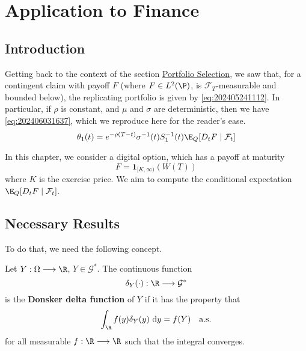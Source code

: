 \chapter{Application to Finance}

\section{Introduction}

Getting back to the context of the section \hyperref[portfolio-selection]{Portfolio Selection}, we saw that, for a contingent claim with payoff $F$ (where $F \in L^2(\P)$, is $\mathcal{F}_T$-measurable and bounded below), the replicating portfolio is given by \eqref{eq:202405241112}. In particular, if $\rho$ is constant, and $\mu$ and $\sigma$ are deterministic, then we have \eqref{eq:202406031637}, which we reproduce here for the reader's ease.
\[
\theta_1 (t) = e^{-\rho(T-t)} \sigma^{-1}(t) S_1^{-1}(t) \E_Q [D_t F \mid \mathcal{F}_t]
\]

In this chapter, we consider a digital option, which has a payoff at maturity
\[
F = \mathbf{1}_{[K, \infty)}(W(T))
\]
where $K$ is the exercise price. We aim to compute the conditional expectation $\E_Q [D_t F \mid \mathcal{F}_t]$. 

\section{Necessary Results}

To do that, we need the following concept.

\begin{definition}
Let $Y : \Omega \longrightarrow \R$, $Y \in \mathcal{G}^\ast$. The continuous function
\[
\delta_Y (\cdot) : \R \longrightarrow {\mathcal{G}^{\ast}}
\]
is the \textbf{Donsker delta function} of $Y$ if it has the property that
\[
\int_\R f(y) \delta_Y(y) ~\mathrm{d}y = f(Y) \quad \text{a.s.}
\]
for all measurable $f : \R \longrightarrow \R$ such that the integral converges. 
\end{definition}

